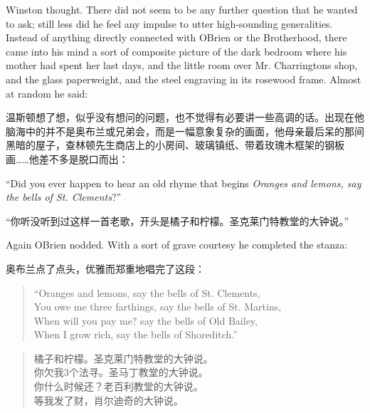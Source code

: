 \begin{paracol}{2}
\switchcolumn*

Winston thought. There did not seem to be any further question that he
wanted to ask; still less did he feel any impulse to utter high-sounding
generalities. Instead of anything directly connected with
O\textquotesingle Brien or the Brotherhood, there came into his mind a
sort of composite picture of the dark bedroom where his mother had spent
her last days, and the little room over Mr.
Charrington\textquotesingle s shop, and the glass paperweight, and the
steel engraving in its rosewood frame. Almost at random he said:

\switchcolumn

温斯顿想了想，似乎没有想问的问题，也不觉得有必要讲一些高调的话。出现在他脑海中的并不是奥布兰或兄弟会，而是一幅意象复杂的画面，他母亲最后呆的那间黑暗的屋子，查林顿先生商店上的小房间、玻璃镇纸、带着玫瑰木框架的钢板画\ldots\ldots 他差不多是脱口而出：

\switchcolumn*

``Did you ever happen to hear an old rhyme that begins \emph{Oranges and
lemons, say the bells of St. Clement\textquotesingle s}?''

\switchcolumn

``你听没听到过这样一首老歌，开头是橘子和柠檬。圣克莱门特教堂的大钟说。''

\switchcolumn*

Again O\textquotesingle Brien nodded. With a sort of grave courtesy he
completed the stanza:

\switchcolumn

奥布兰点了点头，优雅而郑重地唱完了这段：

\switchcolumn*

\begin{quotation}
  \noindent ``Oranges and lemons, say the bells of St. Clement\textquotesingle s,\\
  You owe me three farthings, say the bells of St. Martin\textquotesingle s,\\
  When will you pay me? say the bells of Old Bailey,\\
  When I grow rich, say the bells of Shoreditch.''
\end{quotation}

\switchcolumn

\begin{quotation}
\noindent 橘子和柠檬。圣克莱门特教堂的大钟说。\\
你欠我3个法寻。圣马丁教堂的大钟说。\\
你什么时候还？老百利教堂的大钟说。\\
等我发了财，肖尔迪奇的大钟说。
\end{quotation}


\end{paracol}
